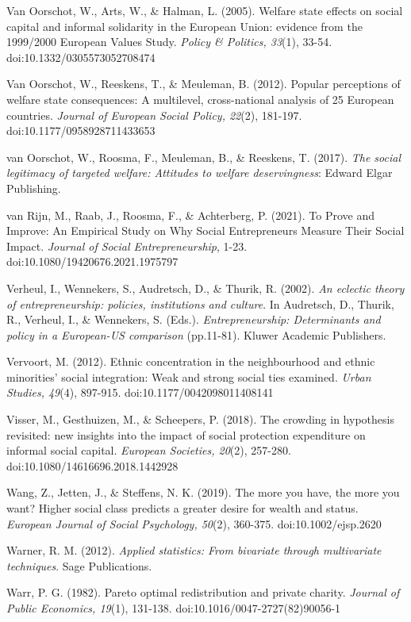 \documentclass{article}
\begin{document}
Van Oorschot, W., Arts, W., \& Halman, L. (2005). Welfare state effects on social capital and informal solidarity in the European Union: evidence from the 1999/2000 European Values Study. \emph{Policy \& Politics, 33}(1), 33-54. doi:10.1332/0305573052708474

Van Oorschot, W., Reeskens, T., \& Meuleman, B. (2012). Popular perceptions of welfare state consequences: A multilevel, cross-national analysis of 25 European countries. \emph{Journal of European Social Policy, 22}(2), 181-197. doi:10.1177/0958928711433653

van Oorschot, W., Roosma, F., Meuleman, B., \& Reeskens, T. (2017). \emph{The social legitimacy of targeted welfare: Attitudes to welfare deservingness}: Edward Elgar Publishing.

van Rijn, M., Raab, J., Roosma, F., \& Achterberg, P. (2021). To Prove and Improve: An Empirical Study on Why Social Entrepreneurs Measure Their Social Impact. \emph{Journal of Social Entrepreneurship}, 1-23. doi:10.1080/19420676.2021.1975797

Verheul, I., Wennekers, S., Audretsch, D., \& Thurik, R. (2002). \emph{An eclectic theory of entrepreneurship: policies, institutions and culture}. In Audretsch, D., Thurik, R., Verheul, I., \& Wennekers, S. (Eds.). \emph{Entrepreneurship: Determinants and policy in a European-US comparison} (pp.11-81). Kluwer Academic Publishers.

Vervoort, M. (2012). Ethnic concentration in the neighbourhood and ethnic minorities' social integration: Weak and strong social ties examined. \emph{Urban Studies, 49}(4), 897-915. doi:10.1177/0042098011408141

Visser, M., Gesthuizen, M., \& Scheepers, P. (2018). The crowding in hypothesis revisited: new insights into the impact of social protection expenditure on informal social capital. \emph{European Societies, 20}(2), 257-280. doi:10.1080/14616696.2018.1442928

Wang, Z., Jetten, J., \& Steffens, N. K. (2019). The more you have, the more you want? Higher social class predicts a greater desire for wealth and status. \emph{European Journal of Social Psychology, 50}(2), 360-375. doi:10.1002/ejsp.2620

Warner, R. M. (2012). \emph{Applied statistics: From bivariate through multivariate techniques}. Sage Publications.

Warr, P. G. (1982). Pareto optimal redistribution and private charity. \emph{Journal of Public Economics, 19}(1), 131-138. doi:10.1016/0047-2727(82)90056-1
\end{document}
